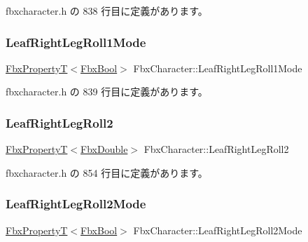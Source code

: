  fbxcharacter.\+h の 838 行目に定義があります。

\mbox{\label{class_fbx_character_ae77c249e4396d92d42a10cba450af36d}} 
\subsubsection{\texorpdfstring{Leaf\+Right\+Leg\+Roll1\+Mode}{LeafRightLegRoll1Mode}}
{\footnotesize\ttfamily \hyperlink{class_fbx_property_t}{Fbx\+PropertyT}$<$\hyperlink{fbxtypes_8h_a92e0562b2fe33e76a242f498b362262e}{Fbx\+Bool}$>$ Fbx\+Character\+::\+Leaf\+Right\+Leg\+Roll1\+Mode}



 fbxcharacter.\+h の 839 行目に定義があります。

\mbox{\label{class_fbx_character_a33fdc7a31e65ce8815ac1d05cd333339}} 
\subsubsection{\texorpdfstring{Leaf\+Right\+Leg\+Roll2}{LeafRightLegRoll2}}
{\footnotesize\ttfamily \hyperlink{class_fbx_property_t}{Fbx\+PropertyT}$<$\hyperlink{fbxtypes_8h_a171e72a1c46fc15c1a6c9c31948c1c5b}{Fbx\+Double}$>$ Fbx\+Character\+::\+Leaf\+Right\+Leg\+Roll2}



 fbxcharacter.\+h の 854 行目に定義があります。

\mbox{\label{class_fbx_character_adc56cbb72fb721c15569e4906be0b2bb}} 
\subsubsection{\texorpdfstring{Leaf\+Right\+Leg\+Roll2\+Mode}{LeafRightLegRoll2Mode}}
{\footnotesize\ttfamily \hyperlink{class_fbx_property_t}{Fbx\+PropertyT}$<$\hyperlink{fbxtypes_8h_a92e0562b2fe33e76a242f498b362262e}{Fbx\+Bool}$>$ Fbx\+Character\+::\+Leaf\+Right\+Leg\+Roll2\+Mode}



